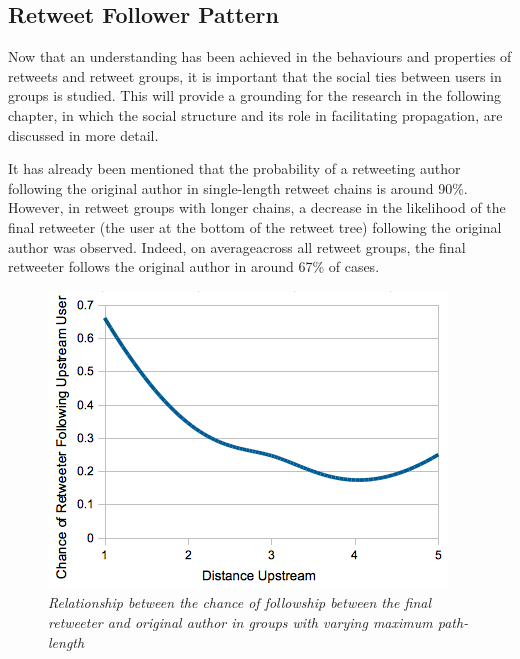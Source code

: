 \subsection{Retweet Follower Pattern}
Now that an understanding has been achieved in the behaviours and properties of retweets and retweet groups, it is important that the social ties between users in groups is studied. This will provide a grounding for the research in the following chapter, in which the social structure and its role in facilitating propagation, are discussed in more detail.

It has already been mentioned that the probability of a retweeting author following the original author in single-length retweet chains is around 90\%. However, in retweet groups with longer chains, a decrease in the likelihood of the final retweeter (the user at the bottom of the retweet tree) following the original author was observed. Indeed, on averageacross all retweet groups, the final retweeter follows the original author in around 67\% of cases.

\begin{figure}[h]
\centering
\includegraphics[scale=0.6]{3.Chapter1/Media/following-possibility.png} 
\caption{\textit{Relationship between the chance of followship between the final retweeter and original author in groups with varying maximum path-length}}
\label{fig:followingchance_pathlength}
\end{figure}


